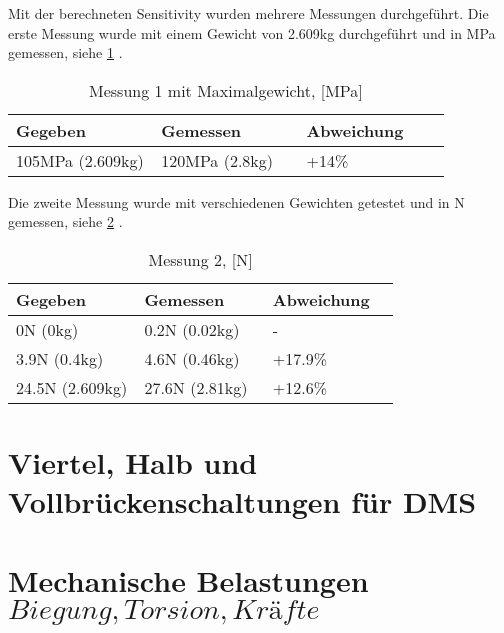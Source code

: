 

Mit der berechneten Sensitivity wurden mehrere Messungen durchgeführt.
Die erste Messung wurde mit einem Gewicht von 2.609kg durchgeführt und in MPa gemessen, siehe \ref{tbl:biegebalkenmessungeins} .

\bgroup
\def\arraystretch{2}
\begin{table}[h]
\centering
\begin{tabular}{|p{0.33\linewidth}|p{0.33\linewidth}|p{0.33\linewidth}|}
\hline
Gegeben & Gemessen & Abweichung \\ \hline
105MPa (2.609kg) & 120MPa (2.8kg) & +14\% \\ \hline
\end{tabular}
\caption{Messung 1 mit Maximalgewicht, [MPa]}
\label{tbl:biegebalkenmessungeins}

\end{table}
\egroup

Die zweite Messung wurde mit verschiedenen Gewichten getestet und in N gemessen, siehe \ref{tbl:biegebalkenmessungzwei} .
\bgroup
\def\arraystretch{2}
\begin{table}[h]
\centering
\begin{tabular}{|p{0.33\linewidth}|p{0.33\linewidth}|p{0.33\linewidth}|}
\hline
Gegeben & Gemessen & Abweichung \\ \hline
0N (0kg) & 0.2N (0.02kg) & - \\ \hline
3.9N (0.4kg) & 4.6N (0.46kg) & +17.9\%  \\ \hline
24.5N (2.609kg) & 27.6N (2.81kg)  & +12.6\% \\ \hline
\end{tabular}
\caption{Messung 2, [N]}
\label{tbl:biegebalkenmessungzwei}

\end{table}
\egroup


\section{Viertel\-, Halb\- und Vollbrückenschaltungen für DMS}
\section{Mechanische Belastungen \(Biegung, Torsion, Kräfte\)}
